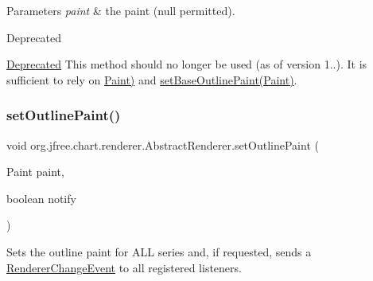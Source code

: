 \begin{DoxyParams}{Parameters}
{\em paint} & the paint ({\ttfamily null} permitted).\\
\hline
\end{DoxyParams}
\begin{DoxyRefDesc}{Deprecated}
\item[\mbox{\hyperlink{deprecated__deprecated000120}{Deprecated}}]This method should no longer be used (as of version 1..). It is sufficient to rely on \mbox{\hyperlink{}{Paint)}} and \mbox{\hyperlink{classorg_1_1jfree_1_1chart_1_1renderer_1_1_abstract_renderer_ab1a850a60c44c51d4cbaa83c294b2f86}{set\+Base\+Outline\+Paint(\+Paint)}}. \end{DoxyRefDesc}
\mbox{\label{classorg_1_1jfree_1_1chart_1_1renderer_1_1_abstract_renderer_a4e71d05784d1a3e4cbc2d7498f0383fd}} 
\subsubsection{\texorpdfstring{set\+Outline\+Paint()}{setOutlinePaint()}\hspace{0.1cm}{\footnotesize\ttfamily [2/2]}}
{\footnotesize\ttfamily void org.\+jfree.\+chart.\+renderer.\+Abstract\+Renderer.\+set\+Outline\+Paint (\begin{DoxyParamCaption}\item[{Paint}]{paint,  }\item[{boolean}]{notify }\end{DoxyParamCaption})}

Sets the outline paint for A\+LL series and, if requested, sends a \mbox{\hyperlink{}{Renderer\+Change\+Event}} to all registered listeners.


